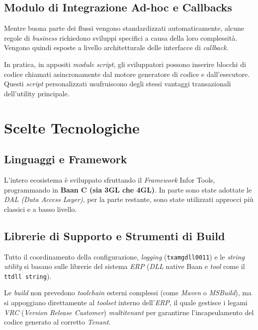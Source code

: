 \subsection{Modulo di Integrazione Ad-hoc e Callbacks}\label{subsec:modulo-di-integrazione-ad-hoc-e-callbacks}
Mentre buona parte dei flussi vengono standardizzati automaticamente, alcune regole di \textit{business} richiedono sviluppi
specifici a causa della loro complessità.
Vengono quindi esposte a livello architetturale delle interfacce di \textit{callback}.

In pratica, in appositi \textit{module script}, gli sviluppatori possono inserire blocchi di codice chiamati asincronamente dal motore generatore di codice e dall'esecutore.
Questi \textit{script} personalizzati usufruiscono degli stessi vantaggi transazionali dell'utility principale.

\section{Scelte Tecnologiche}
\subsection{Linguaggi e Framework}
L'intero ecosistema è sviluppato sfruttando il \textit{Framework} Infor Tools, programmando in \textbf{Baan C (sia 3GL che 4GL)}.
In parte sono state adottate le \textit{DAL (Data Access Layer)}, per la parte restante, sono state utilizzati approcci
più classici e a basso livello.

\subsection{Librerie di Supporto e Strumenti di Build}
Tutto il coordinamento della configurazione, \textit{logging} (\texttt{txamgdll0011}) e le \textit{string utility} si basano sulle librerie
del sistema \textit{ERP} (\textit{DLL} native Baan e \textit{tool} come il \texttt{ttdll string}).

Le \textit{build} non prevedono \textit{toolchain} esterni complessi
(come \textit{Maven} o \textit{MSBuild}), ma si appoggiano direttamente al \textit{toolset} interno dell'\textit{ERP}, il quale gestisce i
legami \textit{VRC} (\textit{Version Release Customer}) \textit{multitenant} per garantirne l'incapsulamento del codice generato al corretto \textit{Tenant}.
